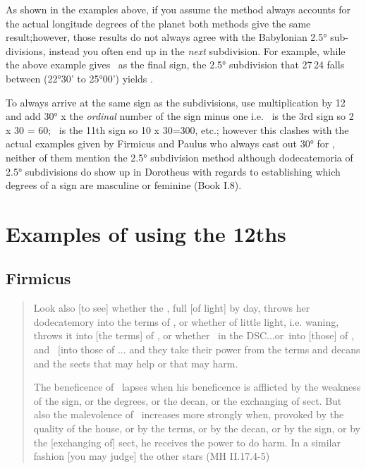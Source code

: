 As shown in the examples above, if you assume the method always accounts for the actual longitude degrees of the planet both methods give the same result;however, those results do not always agree with the Babylonian 2.5° sub-divisions, instead you often end up in the \textsl{next} subdivision. For example, while the above example gives \Capricorn\, as the final sign, the 2.5° subdivision that 27\Aquarius\,24 falls between (22°30' to 25°00') yields \Sagittarius. 

To always arrive at the same sign as the subdivisions, use multiplication by 12 and add 30° x the \textsl{ordinal} number of the sign minus one i.e. \Gemini\, is the 3rd sign so 2 x 30 = 60; \Aquarius\, is the 11th sign so 10 x 30=300, etc.; however this clashes with the actual examples given by Firmicus and Paulus who always cast out 30° for \Aries, neither of them mention the 2.5° subdivision method although dodecatemoria of 2.5° subdivisions do show up in Dorotheus with regards to establishing which degrees of a sign are masculine or feminine (Book I.8).


\section{Examples of using the 12ths}
\subsection{Firmicus}
\begin{quote}
Look also [to see] whether the \Moon, full [of light] by day, throws her dodecatemory into the terms of \Mars, or whether of little light, i.e. waning, throws it into [the terms] of \Saturn, or whether \Mars\, in the DSC...or\Venus\, into [those] of \Mars, and \Mars\, [into those of \Venus... and they take their power from the terms and decans and the sects that may help or that may harm.

The beneficence of \Jupiter\, lapses when his beneficence is afflicted by the weakness of the sign, or the degrees, or the decan, or the exchanging of sect. But also the malevolence of \Saturn\, increases more strongly when, provoked by the quality of the house, or by the terms, or by the decan, or by the sign, or by the [exchanging of] sect, he receives the power to do harm. In a similar fashion [you may judge] the other stars (MH II.17.4-5)
\end{quote}

